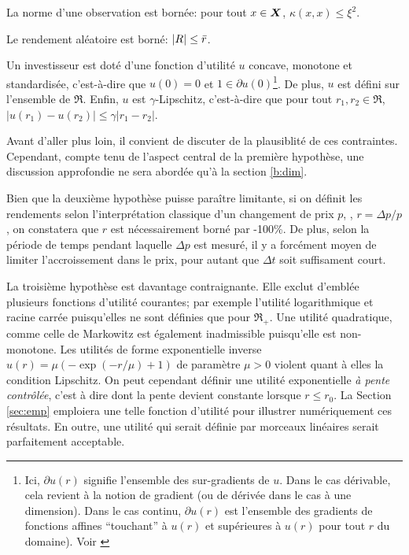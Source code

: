 \begin{assumption}
  La norme d'une observation est bornée: pour tout $x \in \bm{X}$, $\kappa(x,x) \leq \xi^2$.
\end{assumption}
\begin{assumption}
  Le rendement aléatoire est borné: $|R| \leq \bar r$.
\end{assumption}
\begin{assumption}
  \label{hyp:lip}
  Un investisseur est doté d'une fonction d'utilité $u$ concave, monotone et standardisée,
  c'est-à-dire que $u(0) = 0$ et $1 \in \partial u(0)$\footnote{Ici, $\partial u(r)$ signifie l'ensemble
    des sur-gradients de $u$. Dans le cas dérivable, cela revient à la notion de gradient
    (ou de dérivée dans le cas à une dimension). Dans le cas continu, $\partial u(r)$ est
    l'ensemble des gradients de fonctions affines ``touchant'' à $u(r)$ et supérieures à
    $u(r)$ pour tout $r$ du domaine). Voir
    \cite{boyd2004convex,rockafellar1970convex}}. De plus, $u$ est défini sur l'ensemble
  de $\Re$. Enfin, $u$ est $\gamma$-Lipschitz, c'est-à-dire que pour tout
  $r_1,r_2 \in \Re$, $|u(r_1) - u(r_2)| \leq \gamma|r_1-r_2|$.
\end{assumption}

Avant d'aller plus loin, il convient de discuter de la plausiblité de ces
contraintes. Cependant, compte tenu de l'aspect central de la première hypothèse, une
discussion approfondie ne sera abordée qu'à la section \ref{b:dim}.

Bien que la deuxième hypothèse puisse paraître limitante, si on définit les rendements
selon l'interprétation classique d'un changement de prix $p$, \ie, $r = \Delta p/p$, on
constatera que $r$ est nécessairement borné par -100\%. De plus, selon la période de temps
pendant laquelle $\Delta p$ est mesuré, il y a forcément moyen de limiter l'accroissement dans
le prix, pour autant que $\Delta t$ soit suffisament court.

La troisième hypothèse est davantage contraignante. Elle exclut d'emblée plusieurs
fonctions d'utilité courantes; par exemple l'utilité logarithmique et racine carrée
puisqu'elles ne sont définies que pour $\Re_{+}$. Une utilité quadratique, comme celle de
Markowitz est également inadmissible puisqu'elle est non-monotone. Les utilités de forme
exponentielle inverse $u(r) = \mu(-\exp(-r/\mu)+1)$ de paramètre $\mu > 0$ violent quant à elles
la condition Lipschitz. On peut cependant définir une utilité exponentielle \textit{à
  pente contrôlée}, c'est à dire dont la pente devient constante lorsque $r \leq r_0$. La
Section \ref{sec:emp} emploiera une telle fonction d'utilité pour illustrer numériquement
ces résultats. En outre, une utilité qui serait définie par morceaux linéaires serait
parfaitement acceptable. 


